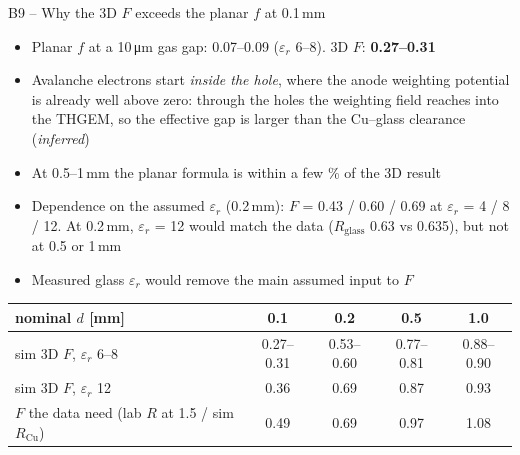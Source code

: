 \documentclass[aspectratio=169,11pt]{beamer}
\newcommand{\backlink}[1]{\hfill\hyperlink{#1}{\beamerreturnbutton{back}}}
\newcommand{\Rglass}{R_\text{glass}}
\newcommand{\RCu}{R_\text{Cu}}
\newcommand{\er}{\varepsilon_r}
\begin{document}
\begin{frame}[label=b-planar]{B9 -- Why the 3D $F$ exceeds the planar $f$ at 0.1\,mm}
  \small
  \begin{itemize}
    \item Planar $f$ at a 10\,\si{\micro m} gas gap: 0.07--0.09 ($\er$ 6--8). 3D $F$: \textbf{0.27--0.31}
    \item Avalanche electrons start \emph{inside the hole}, where the anode weighting potential is already well above zero: through the holes the weighting field reaches into the THGEM, so the effective gap is larger than the Cu--glass clearance (\emph{inferred})
    \item At 0.5--1\,mm the planar formula is within a few \% of the 3D result
    \item Dependence on the assumed $\er$ (0.2\,mm): $F$ = 0.43 / 0.60 / 0.69 at $\er$ = 4 / 8 / 12. At 0.2\,mm, $\er$ = 12 would match the data ($\Rglass$ 0.63 vs 0.635), but not at 0.5 or 1\,mm
    \item Measured glass $\er$ would remove the main assumed input to $F$
  \end{itemize}
  \vspace{6pt}
  \centering\footnotesize
  \begin{tabular}{lcccc}\toprule
    nominal $d$ [mm] & 0.1 & 0.2 & 0.5 & 1.0\\\midrule
    sim 3D $F$, $\er$ 6--8 & 0.27--0.31 & 0.53--0.60 & 0.77--0.81 & 0.88--0.90\\
    sim 3D $F$, $\er$ 12 & 0.36 & 0.69 & 0.87 & 0.93\\
    $F$ the data need (lab $R$ at 1.5 / sim $\RCu$) & 0.49 & 0.69 & 0.97 & 1.08\\\bottomrule
  \end{tabular}
  \par\raggedright\backlink{m-F}
\end{frame}
\end{document}
